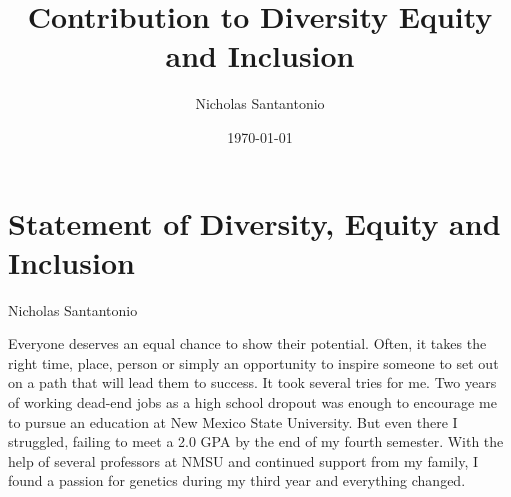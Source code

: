 \documentclass[11pt]{article}
\title{Contribution to Diversity Equity and Inclusion}
\author{Nicholas Santantonio}
\date{\today}
\newcommand{\amy}[1]{{\color{amyCol} [\textbf{Amy:} #1]}}
\begin{document}

\section*{\centering Statement of Diversity, Equity and Inclusion}
\begin{center} Nicholas Santantonio \end{center}


\noindent {}

\medskip



Everyone deserves an equal chance to show their potential. Often, it takes the right time, place, person or simply an opportunity to inspire someone to set out on a path that will lead them to success. It took several tries for me. Two years of working dead-end jobs as a high school dropout was enough to encourage me to pursue an education at New Mexico State University. But even there I struggled, failing to meet a 2.0 GPA by the end of my fourth semester. With the help of several professors at NMSU and continued support from my family, I found a passion for genetics during my third year and everything changed.
\end{document}
